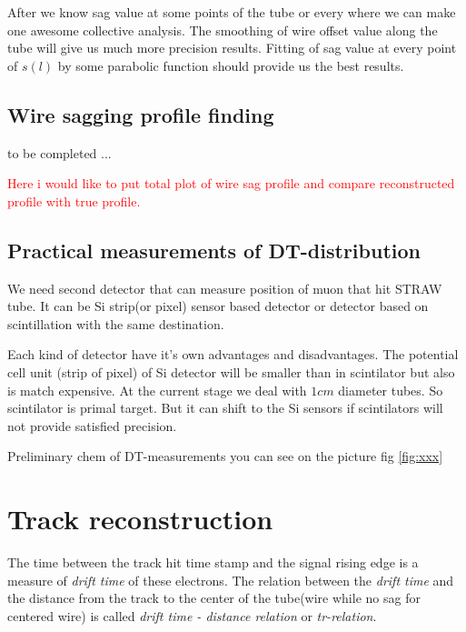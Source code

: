 \documentclass[]{article}
\begin{document}
	After we know sag value at some points of the tube or every where we can make one awesome collective analysis. The smoothing of wire offset value along the tube will give us much more precision results.  Fitting of sag value at  every point of $s(l)$ by some parabolic function should provide us the best results.
	
	\subsection{Wire sagging profile finding}
	
	to be completed	...
	
	\textcolor{red}{Here i would like to put total plot of wire sag profile and compare reconstructed profile with true profile.}
	
	\subsection{Practical measurements of DT-distribution}
	
	We need second detector that can measure position of muon that hit STRAW tube. It can be Si strip(or pixel) sensor based detector or detector based on scintillation  with the same destination. 
	
	Each kind of detector have it's own advantages and disadvantages. The potential cell unit (strip of pixel) of Si detector will be smaller than in scintilator but also is match expensive. At the current stage we deal with $1cm$ diameter tubes. So scintilator is primal target. But it can shift to the Si sensors if scintilators will not provide satisfied precision.
	
	Preliminary chem of DT-measurements you can see on the picture fig \ref{fig:xxx}
	
	\begin{figure}
		
	\end{figure}		
		
	\section{Track reconstruction}
	
	The time between the track hit time stamp and the signal rising edge is a measure of {\it drift time} of these electrons. The relation between the   {\it drift time} and  the distance from the track to the center of the tube(wire while no sag for centered wire) is called {\it drift time - distance relation} or {\it tr-relation}.
	
\end{document}

